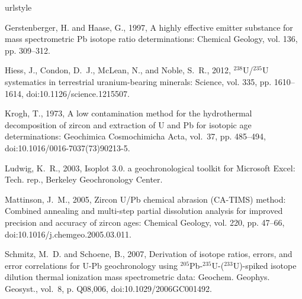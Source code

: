 \documentclass[11pt,letterpaper]{article}
\begin{document}
\clearpage
\pagebreak
\singlespacing

\small
\begin{thebibliography}{6}
\providecommand{\natexlab}[1]{#1}
\providecommand{\url}[1]{\texttt{#1}}
\providecommand{\urlprefix}{URL }
\expandafter\ifx\csname urlstyle\endcsname\relax
  \providecommand{\doi}[1]{doi:\discretionary{}{}{}#1}\else
  \providecommand{\doi}{doi:\discretionary{}{}{}\begingroup
  \urlstyle{rm}\Url}\fi

Gerstenberger, H. and Haase, G., 1997, A highly effective emitter substance for
  mass spectrometric {P}b isotope ratio determinations: Chemical Geology, vol.
  136, pp. 309--312.

Hiess, J., Condon, D.~J., McLean, N., and Noble, S.~R., 2012,
  $^{238}${U}/$^{235}${U} systematics in terrestrial uranium-bearing minerals:
  Science, vol. 335, pp. 1610--1614, \doi{10.1126/science.1215507}.

Krogh, T., 1973, A low contamination method for the hydrothermal decomposition
  of zircon and extraction of {U} and {P}b for isotopic age determinations:
  Geochimica Cosmochimicha Acta, vol.~37, pp. 485--494,
  \doi{10.1016/0016-7037(73)90213-5}.

Ludwig, K.~R., 2003, Isoplot 3.0. a geochronological toolkit for {M}icrosoft
  {E}xcel: Tech. rep., Berkeley Geochronology Center.

Mattinson, J.~M., 2005, {Zircon U/Pb chemical abrasion (CA-TIMS) method:
  Combined annealing and multi-step partial dissolution analysis for improved
  precision and accuracy of zircon ages}: Chemical Geology, vol. 220, pp.
  47--66, \doi{10.1016/j.chemgeo.2005.03.011}.

Schmitz, M.~D. and Schoene, B., 2007, {Derivation of isotope ratios, errors,
  and error correlations for U-Pb geochronology using
  $^{205}$Pb-$^{235}$U-($^{233}$U)-spiked isotope dilution thermal ionization
  mass spectrometric data}: Geochem. Geophys. Geosyst., vol.~8, p. Q08,006,
  \doi{10.1029/2006GC001492}.

\end{thebibliography}

%
%
\end{document}
